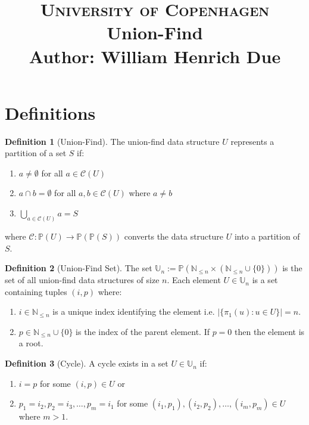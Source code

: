 \documentclass[a4paper,12pt]{article}
\title{
    {\Large \textsc{University of Copenhagen}} \\[5pt]
    {\large Union-Find} \\[10pt]
    Author: William Henrich Due \\[0pt]
}
\author{}
\date{}
\theoremstyle{definition}
\newtheorem{definition}{Definition}[section]
\begin{document}
\maketitle
\thispagestyle{firstpage}

\section{Definitions}

\begin{definition}[Union-Find]\label{def:union-find} The
    union-find data structure $U$ represents a partition of a set $S$ if:
    \begin{enumerate}
        \item $a \neq \emptyset$ for all $a \in \mathcal{C}(U)$
        \item $a \cap b = \emptyset$ for all $a, b \in \mathcal{C}(U)$ where $a
        \neq b$
        \item $\bigcup_{a \in \mathcal{C}(U)} a = S$
    \end{enumerate}
    where $\mathcal{C} : \mathbb{P}(U) \to \mathbb{P}(\mathbb{P}(S))$ converts
    the data structure $U$ into a partition of $S$.
\end{definition}

\begin{definition}[Union-Find Set]
    The set $\mathbb{U}_n := \mathbb{P}(\mathbb{N}_{\leq n} \times
    (\mathbb{N}_{\leq n} \cup \{0\}))$ is the set of all union-find
    data structures of size $n$. Each element $U \in \mathbb{U}_n$ is a set
    containing tuples $(i, p)$ where:
    \begin{enumerate}
        \item $i \in \mathbb{N}_{\leq n}$ is a unique index identifying the
        element i.e. $|\{\pi_1(u) : u \in U\}| = n$.
        \item $p \in \mathbb{N}_{\leq n} \cup \{0\}$ is the index of the parent
        element. If $p = 0$ then the element is a root.
    \end{enumerate}
\end{definition}

\begin{definition}[Cycle]\label{def:cycle} A cycle exists in a set $U \in
    \mathbb{U}_n$ if:
    \begin{enumerate}
        \item $i = p$ for some $(i, p) \in U$ or
        \item $p_1 = i_2, p_2 = i_3, \ldots, p_m = i_1$ for some $(i_1, p_1),
        (i_2, p_2), \ldots, (i_m, p_m) \in U$ where $m > 1$.
    \end{enumerate}
\end{definition}
\end{document}
